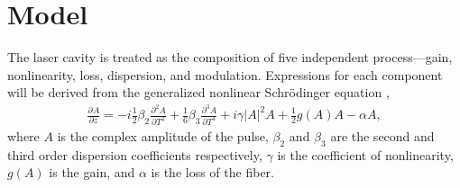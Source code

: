 \documentclass[12pt]{article}
\title{}
\author{Brady Metherall}
\newcommand{\pdiff}[3][]{\frac{\partial^{#1}#2}{\partial{#3}^{#1}}}
\begin{document}
\maketitle

\section{Model}
The laser cavity is treated as the composition of five independent process---gain, nonlinearity, loss, dispersion, and modulation. Expressions for each component will be derived from the  generalized nonlinear Schr\"{o}dinger equation \cite{agrawal, ferreira, shtyrina, yarutkina},
\begin{align}
\label{eq:nlse}
\pdiff{A}{z} = - i \frac{1}{2} \beta_2 \pdiff[2]{A}{T} + \frac{1}{6} \beta_3 \pdiff[3]{A}{T} + i \gamma |A|^2 A + \frac{1}{2}g(A) A - \alpha A,
\end{align}
where $A$ is the complex amplitude of the pulse, $\beta_2$ and $\beta_3$ are the second and third order dispersion coefficients respectively, $\gamma$ is the coefficient of nonlinearity, $g(A)$ is the gain, and $\alpha$ is the loss of the fiber.
\end{document}
